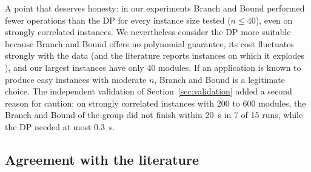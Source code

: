 A point that deserves honesty: in our experiments Branch and Bound performed fewer operations than the DP for every instance size tested ($n\le40$), even on strongly correlated instances. We nevertheless consider the DP more suitable because Branch and Bound offers no polynomial guarantee, its cost fluctuates strongly with the data (and the literature reports instances on which it explodes \cite{pisinger2005}), and our largest instances have only 40 modules. If an application is known to produce easy instances with moderate $n$, Branch and Bound is a legitimate choice. The independent validation of Section~\ref{sec:validation} added a second reason for caution: on strongly correlated instances with 200 to 600 modules, the Branch and Bound of the group did not finish within 20~s in 7 of 15 runs, while the DP needed at most 0.3~s.

\subsection{Agreement with the literature}

